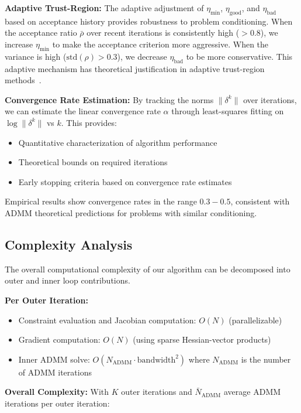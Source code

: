 \textbf{Adaptive Trust-Region:} The adaptive adjustment of $\eta_{\text{min}}$, $\eta_{\text{good}}$, and $\eta_{\text{bad}}$ based on acceptance history provides robustness to problem conditioning. When the acceptance ratio $\bar{\rho}$ over recent iterations is consistently high ($> 0.8$), we increase $\eta_{\text{min}}$ to make the acceptance criterion more aggressive. When the variance is high ($\text{std}(\rho) > 0.3$), we decrease $\eta_{\text{bad}}$ to be more conservative. This adaptive mechanism has theoretical justification in adaptive trust-region methods~\cite{conn}.

\textbf{Convergence Rate Estimation:} By tracking the norms $\|\delta^k\|$ over iterations, we can estimate the linear convergence rate $\alpha$ through least-squares fitting on $\log \|\delta^k\|$ vs $k$. This provides:
\begin{itemize}
\item Quantitative characterization of algorithm performance
\item Theoretical bounds on required iterations
\item Early stopping criteria based on convergence rate estimates
\end{itemize}

Empirical results show convergence rates in the range $0.3-0.5$, consistent with ADMM theoretical predictions for problems with similar conditioning.

\subsection{Complexity Analysis}

The overall computational complexity of our algorithm can be decomposed into outer and inner loop contributions.

\textbf{Per Outer Iteration:}
\begin{itemize}
\item Constraint evaluation and Jacobian computation: $O(N)$ (parallelizable)
\item Gradient computation: $O(N)$ (using sparse Hessian-vector products)
\item Inner ADMM solve: $O(N_{\text{ADMM}} \cdot \text{bandwidth}^2)$ where $N_{\text{ADMM}}$ is the number of ADMM iterations
\end{itemize}

\textbf{Overall Complexity:} With $K$ outer iterations and $\bar{N}_{\text{ADMM}}$ average ADMM iterations per outer iteration:

